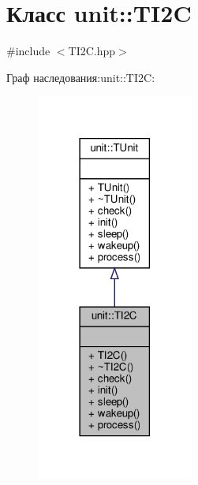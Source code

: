 \hypertarget{classunit_1_1_t_i2_c}{}\section{Класс unit\+:\+:T\+I2C}
\label{classunit_1_1_t_i2_c}


{\ttfamily \#include $<$T\+I2\+C.\+hpp$>$}



Граф наследования\+:unit\+:\+:T\+I2C\+:\nopagebreak
\begin{figure}[H]
\begin{center}
\leavevmode
\includegraphics[width=146pt]{classunit_1_1_t_i2_c__inherit__graph}
\end{center}
\end{figure}


